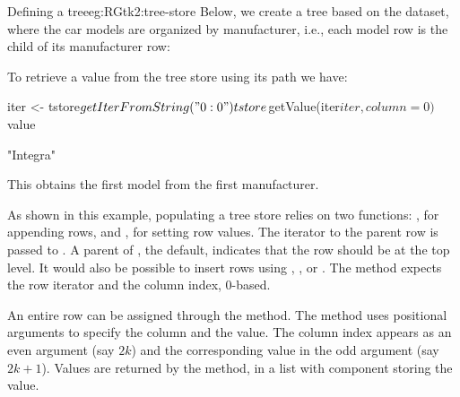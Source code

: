 \begin{example}{Defining a tree}{eg:RGtk2:tree-store}
  Below, we create a tree based on the  dataset, where
  the car models are organized by manufacturer, i.e., each model row
  is the child of its manufacturer row:
\begin{Schunk}
\end{Schunk}
  To retrieve a value from the tree store using its path we have:
\begin{Schunk}
\begin{Sinput}
 iter <- tstore$getIterFromString("0:0")
 tstore$getValue(iter$iter, column = 0)$value
\end{Sinput}
\begin{Soutput}
[1] "Integra"
\end{Soutput}
\end{Schunk}
This obtains the first model from the first manufacturer.

\end{example}

As shown in this example, populating a tree store relies on two
functions: , for appending rows, and
, for setting row values. The iterator
to the parent row is passed to . A parent
of , the default, indicates that the row should be at the
top level. It would also be possible to insert rows using
, , or
. The
 method expects the row iterator and
the column index, $0$-based.

An entire row can be assigned through the 
method. The method uses positional arguments to specify the column and
the value. The column index appears as an even argument (say $2k$) and
the corresponding value in the odd argument (say $2k+1$).  Values are
returned by the  method, in a list with
component  storing the value.

